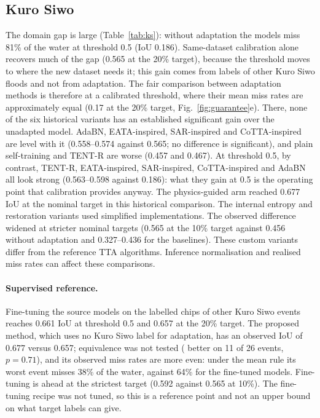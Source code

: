 \subsection{Kuro Siwo}
The domain gap is large (Table~\ref{tab:ks}): without adaptation the models miss 81\% of the water at threshold 0.5 (IoU 0.186). Same-dataset calibration alone recovers much of the gap (0.565 at the 20\% target), because the threshold moves to where the new dataset needs it; this gain comes from labels of other Kuro Siwo floods and not from adaptation. The fair comparison between adaptation methods is therefore at a calibrated threshold, where their mean miss rates are approximately equal (0.17 at the 20\% target, Fig.~\ref{fig:guarantee}e). There, none of the six historical variants has an established significant gain over the unadapted model. AdaBN, EATA-inspired, SAR-inspired and CoTTA-inspired are level with it (0.558--0.574 against 0.565; no difference is significant), and plain self-training and TENT-R are worse (0.457 and 0.467). At threshold 0.5, by contrast, TENT-R, EATA-inspired, SAR-inspired, CoTTA-inspired and AdaBN all look strong (0.563--0.598 against 0.186): what they gain at 0.5 is the operating point that calibration provides anyway. The physics-guided arm reached 0.677 IoU at the nominal target in this historical comparison. The internal entropy and restoration variants used simplified implementations. The observed difference widened at stricter nominal targets (0.565 at the 10\% target against 0.456 without adaptation and 0.327--0.436 for the baselines). These custom variants differ from the reference TTA algorithms. Inference normalisation and realised miss rates can affect these comparisons.

\paragraph{Supervised reference.} Fine-tuning the source models on the labelled chips of other Kuro Siwo events reaches 0.661 IoU at threshold 0.5 and 0.657 at the 20\% target. The proposed method, which uses no Kuro Siwo label for adaptation, has an observed IoU of 0.677 versus 0.657; equivalence was not tested ( better on 11 of 26 events, $p=0.71$), and its observed miss rates are more even: under the mean rule its worst event misses 38\% of the water, against 64\% for the fine-tuned models. Fine-tuning is ahead at the strictest target (0.592 against 0.565 at 10\%). The fine-tuning recipe was not tuned, so this is a reference point and not an upper bound on what target labels can give.

